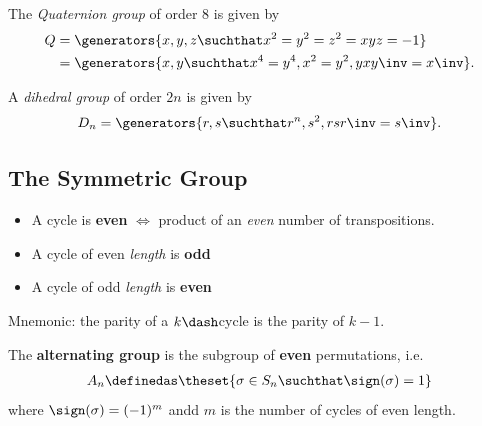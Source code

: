 \begin{definition}

The \emph{Quaternion group} of order 8 is given by \begin{align*}
Q &= \generators{x,y,z \suchthat x^2 = y^2 = z^2 = xyz = -1} \\
  &= \generators{x, y \suchthat  x^4 = y^4, x^2 = y^2, yxy\inv = x\inv}
.\end{align*}

\end{definition}

\begin{definition}

A \emph{dihedral group} of order \(2n\) is given by \begin{align*}
D_n = \generators{r, s \suchthat r^n, s^2, rsr\inv = s\inv }
.\end{align*}

\end{definition}

\hypertarget{the-symmetric-group}{%
\subsection{The Symmetric Group}\label{the-symmetric-group}}

\begin{definition}

\begin{itemize}
\item
  A cycle is \textbf{even} \(\iff\) product of an \emph{even} number of
  transpositions.
\item
  A cycle of even \emph{length} is \textbf{odd}
\item
  A cycle of odd \emph{length} is \textbf{even}
\end{itemize}

\end{definition}

Mnemonic: the parity of a \(k\dash\)cycle is the parity of \(k-1\).

\begin{definition}

The \textbf{alternating group} is the subgroup of \textbf{even}
permutations, i.e.
\begin{align*}A_n \definedas \theset{\sigma \in S_n \suchthat \sign(\sigma) = 1}\end{align*}
where \(\sign(\sigma) = (-1)^{m}\) andd \(m\) is the number of cycles of
even length.

\end{definition}

